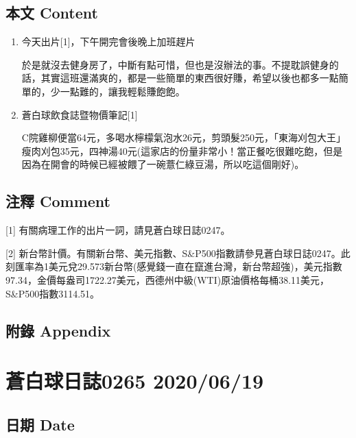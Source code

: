 \documentclass[
]{article}
\begin{document}
\hypertarget{ux672cux6587-content-15}{%
\subsection{本文 Content}\label{ux672cux6587-content-15}}

\begin{enumerate}
\def\labelenumi{\arabic{enumi}.}
\item
  今天出片{[}1{]}，下午開完會後晚上加班趕片

  於是就沒去健身房了，中斷有點可惜，但也是沒辦法的事。不提耽誤健身的話，其實這班還滿爽的，都是一些簡單的東西很好賺，希望以後也都多一點簡單的，少一點難的，讓我輕鬆賺飽飽。
\item
  蒼白球飲食誌暨物價筆記{[}1{]}

  C院雞柳便當64元，多喝水檸檬氣泡水26元，剪頭髮250元，「東海刈包大王」瘦肉刈包35元，四神湯40元(這家店的份量非常小！當正餐吃很難吃飽，但是因為在開會的時候已經被餵了一碗薏仁綠豆湯，所以吃這個剛好)。
\end{enumerate}

\hypertarget{ux6ce8ux91cb-comment-15}{%
\subsection{注釋 Comment}\label{ux6ce8ux91cb-comment-15}}

{[}1{]} 有關病理工作的出片一詞，請見蒼白球日誌0247。

{[}2{]}
新台幣計價。有關新台幣、美元指數、S\&P500指數請參見蒼白球日誌0247。此刻匯率為1美元兌29.573新台幣(感覺錢一直在竄進台灣，新台幣超強)，美元指數97.34，金價每盎司1722.27美元，西德州中級(WTI)原油價格每桶38.11美元，S\&P500指數3114.51。

\hypertarget{ux9644ux9304-appendix-15}{%
\subsection{附錄 Appendix}\label{ux9644ux9304-appendix-15}}

\hypertarget{ux84bcux767dux7403ux65e5ux8a8c0265-20200619}{%
\section{蒼白球日誌0265
2020/06/19}\label{ux84bcux767dux7403ux65e5ux8a8c0265-20200619}}

\hypertarget{ux65e5ux671f-date-16}{%
\subsection{日期 Date}\label{ux65e5ux671f-date-16}}
\end{document}
